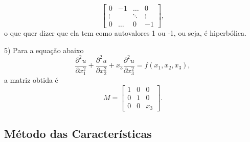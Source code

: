 \documentclass[.../pde_notes.tex]{subfiles}
\begin{document}
\begin{example}
\[\begin{bmatrix}
			0      & -1     & \dotsc & 0      \\
			\vdots &        & \ddots & \vdots \\
			0      & \dotsc & 0      & -1
		\end{bmatrix},
	\]
	o que quer dizer que ela tem como autovalores 1 ou -1, ou seja, é hiperbólica.
	\item[5)] Para a equação abaixo
	\[
		\frac{\partial^{2}u}{\partial x_1^{2}} + \frac{\partial^{2}u}{\partial x_2^{2}} + x_3\frac{\partial^{2}u}{\partial x_3^{2}} = f(x_1, x_2, x_3),
	\]
	a matriz obtida é
	\[
		M = \begin{bmatrix}
			1 & 0 & 0   \\
			0 & 1 & 0   \\
			0 & 0 & x_3
		\end{bmatrix}.
	\]
\end{example}
\subsection{Método das Características}
\end{document}
